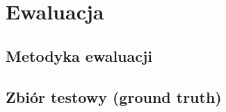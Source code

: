 \chapter{Ewaluacja}\label{ch:ewaluacja}


\section{Metodyka ewaluacji}\label{sec:metodyka-ewaluacji}

%
%
%
%
%

\section{Zbiór testowy (ground truth)}\label{sec:ground-truth}

